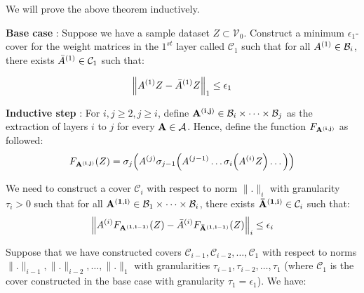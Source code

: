 \begin{proof*}
    \noindent We will prove the above theorem inductively. 
    
    \noindent\newline\textbf{Base case} : Suppose we have a sample dataset $Z\subset\mathcal{V}_0$. Construct a minimum $\epsilon_1$-cover for the weight matrices in the $1^{st}$ layer called $\mathcal{C}_1$ such that for all $A^{(1)}\in\mathcal{B}_i$, there exists ${\bar A}^{(1)}\in\mathcal{C}_1$ such that:

    \begin{align*}
        \Big\|A^{(1)}Z - {\bar A}^{(1)}Z\Big\|_1 \le \epsilon_1
    \end{align*} 
    
    
    \noindent \textbf{Inductive step} : For $i, j \ge 2, j \ge i$, define ${\bf A^{(i, j)}}\in\mathcal{B}_i\times\dots\times\mathcal{B}_j$ as the extraction of layers $i$ to $j$ for every ${\bf A}\in\mathcal{A}$. Hence, define the function $F_{\bf A^{(i, j)}}$ as followed:
    \begin{align*}
        F_{\bf A^{(i, j)}}(Z) = \sigma_j\Big( 
            A^{(j)}\sigma_{j-1}\Big( 
                A^{(j-1)}\dots\sigma_i\Big( A^{(i)}Z \Big)\dots
             \Big)
         \Big)
    \end{align*} 
    
    
    \noindent We need to construct a cover $\mathcal{C}_i$ with respect to norm $\|.\|_i$ with granularity $\tau_i>0$ such that for all ${\bf A^{(1, i)}}\in \mathcal{B}_1\times\dots\times\mathcal{B}_i$, there exists ${\bf {\bar A}^{(1, i)}}\in \mathcal{C}_{i}$ such that: 
    \begin{align*}
        \Big\|
            A^{(i)}F_{\bf A^{(1, i-1)}}(Z) - {\bar A}^{(i)}F_{\bf {\bar A}^{(1, i-1)}}(Z)
        \Big\|_i \le \epsilon_i
    \end{align*}

    \noindent Suppose that we have constructed covers $\mathcal{C}_{i-1}, \mathcal{C}_{i-2}, \dots, \mathcal{C}_1$ with respect to norms $\|.\|_{i-1}, \|.\|_{i-2}, \dots, \|.\|_1$ with granularities $\tau_{i-1}, \tau_{i-2}, \dots, \tau_1$ (where $\mathcal{C}_1$ is the cover constructed in the base case with \newline granularity $\tau_1=\epsilon_1$). We have:


\end{proof*}
